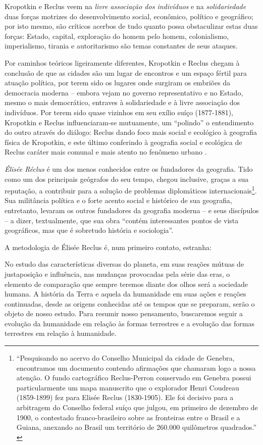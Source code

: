 Kropotkin e Reclus veem na \textit{livre associação dos indivíduos} e na \textit{solidariedade} duas forças motrizes do desenvolvimento social, econômico, político e geográfico; por isto mesmo, são críticos acerbos de tudo quanto possa obstaculizar estas duas forças: Estado, capital, exploração do homem pelo homem, colonialismo, imperialismo, tirania e autoritarismo são temas constantes de seus ataques.

Por caminhos teóricos ligeiramente diferentes, Kropotkin e Reclus chegam à conclusão de que as cidades são um lugar de encontros e um espaço fértil para atuação política, por terem sido os lugares onde surgiram os embriões da democracia moderna -- embora vejam no governo representativo e no Estado, mesmo o mais democrático, entraves à solidariedade e à livre associação dos indivíduos. Por terem sido quase vizinhos em seu exílio suíço (1877-1881), Kropotkin e Reclus influenciaram-se mutuamente, um ``polindo'' o entendimento do outro através do diálogo: Reclus dando foco mais social e ecológico à geografia física de Kropotkin, e este último conferindo à geografia social e ecológica de Reclus caráter mais comunal e mais atento no fenômeno urbano \cite[p.~209-210]{WARD2010}.

\textit{Élisée Réclus} é um dos menos conhecidos entre os fundadores da geografia. Tido como um dos principais geógrafos do seu tempo, chegou inclusive, graças a sua reputação, a contribuir para a solução de problemas diplomáticos internacionais\footnote{``Pesquisando no acervo do Conselho Municipal da cidade de Genebra, encontramos um documento contendo afirmações que chamaram logo a nossa atenção. O fundo cartográfico Reclus-Perron conservado em Genebra possui particularmente um mapa manuscrito que o explorador Henri Coudreau (1859-1899) fez para Elisée Reclus (1830-1905). Ele foi decisivo para a arbitragem do Conselho federal suíço que julgou, em primeiro de dezembro de 1900, o contestado franco-brasileiro sobre as fronteiras entre o Brasil e a Guiana, anexando ao Brasil um território de 260.000 quilômetros quadrados.'' \cite[p.~2]{FERRETTI2013}}. Sua militância política e o forte acento social e histórico de sua geografia, entretanto, levaram os outros fundadores da geografia moderna -- e seus discípulos -- a dizer, textualmente, que sua obra ``contém interessantes pontos de vista geográficos, mas que é sobretudo história e sociologia''.

A metodologia de Élisée Reclus é, num primeiro contato, estranha:

\begin{citacao}
No estudo das características diversas do planeta, em suas reações mútuas de justaposição e influência, nas mudanças provocadas pela série das eras, o elemento de comparação que sempre teremos diante dos olhos será a sociedade humana. A história da Terra e aquela da humanidade em suas ações e reações continuadas, desde as origens conhecidas até os tempos que se preparam, serão o objeto de nosso estudo. Para resumir nosso pensamento, buscaremos seguir a evolução da humanidade em relação às formas terrestres e a evolução das formas terrestres em relação à humanidade. \cite[pp.~78-79]{reclus_renovacao_2010}
\end{citacao}

